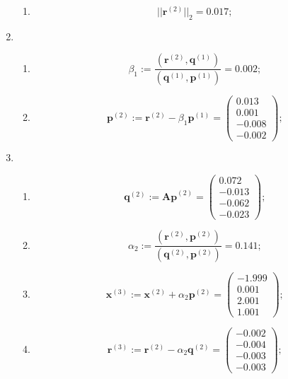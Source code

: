 \begin{enumerate}
\begin{enumerate}
        \item $$||\mathbf{r}^{(2)}||_2 = \mathbf{0.017};$$
    \end{enumerate}

    \item \begin{enumerate}
        \item $$\beta_1 :=
            \dfrac{(\mathbf{r}^{(2)}, \mathbf{q}^{(1)})}{(\mathbf{q}^{(1)}, \mathbf{p}^{(1)})} = 0.002;$$

        \item $$\mathbf{p}^{(2)} :=
            \mathbf{r}^{(2)}-\beta_1\mathbf{p}^{(1)} = \begin{pmatrix} 0.013\\0.001\\-0.008\\-0.002 \end{pmatrix};$$
    \end{enumerate}

    \item \begin{enumerate}
        \item $$\mathbf{q}^{(2)} :=
            \mathbf{Ap}^{(2)} = \begin{pmatrix}0.072\\-0.013\\-0.062\\-0.023\end{pmatrix};$$

        \item $$\alpha_2 :=
            \dfrac{(\mathbf{r}^{(2)}, \mathbf{p}^{(2)})}{(\mathbf{q}^{(2)}, \mathbf{p}^{(2)})} = 0.141;$$

        \item $$\mathbf{x}^{(3)} :=
            \mathbf{x}^{(2)}+\alpha_2\mathbf{p}^{(2)} = \begin{pmatrix}-1.999\\0.001\\2.001\\1.001\end{pmatrix};$$

        \item $$\mathbf{r}^{(3)} :=
            \mathbf{r}^{(2)}-\alpha_2\mathbf{q}^{(2)} = \begin{pmatrix}-0.002\\-0.004\\-0.003\\-0.003 \end{pmatrix};$$


\end{enumerate}
\end{enumerate}
